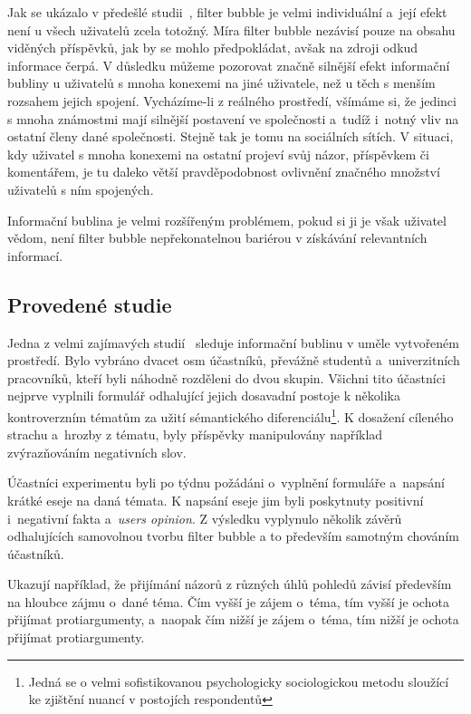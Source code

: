 \documentclass[12pt, a4paper]{article}
\numberwithin{equation}{section} 	%
\begin{document}
Jak se ukázalo v předešlé studii~\cite{TheImpactOfFilterBubble}, filter bubble je velmi individuální a~její efekt není u všech uživatelů zcela totožný. Míra filter bubble nezávisí pouze na obsahu viděných příspěvků, jak by se mohlo předpokládat, avšak na zdroji odkud informace čerpá. V důsledku můžeme pozorovat značně silnější efekt informační bubliny u uživatelů s mnoha konexemi na jiné uživatele, než u těch s menším rozsahem jejich spojení. Vycházíme-li z reálného prostředí, všímáme si, že jedinci s mnoha známostmi mají silnější postavení ve společnosti a~tudíž i~notný vliv na ostatní členy dané společnosti. Stejně tak je tomu na sociálních sítích. V situaci, kdy uživatel s mnoha konexemi na ostatní projeví svůj názor, příspěvkem či komentářem, je tu daleko větší pravděpodobnost ovlivnění značného množství uživatelů s ním spojených.

Informační bublina je velmi rozšířeným problémem, pokud si ji je však uživatel vědom, není filter bubble nepřekonatelnou bariérou v získávání relevantních informací.

\subsection{Provedené studie}
\noindent Jedna z velmi zajímavých studií~\cite{BeyondFilterBubble} sleduje informační bublinu v uměle vytvořeném prostředí. Bylo vybráno dvacet osm účastníků, převážně studentů a~univerzitních pracovníků, kteří byli náhodně rozděleni do dvou skupin. Všichni tito účastníci nejprve vyplnili formulář odhalující jejich dosavadní postoje k několika kontroverzním tématům za užití sémantického diferenciálu\footnote{Jedná se o velmi sofistikovanou psychologicky sociologickou metodu sloužící ke zjištění nuancí v postojích respondentů}. K dosažení cíleného strachu a~hrozby z tématu, byly příspěvky manipulovány například zvýrazňováním negativních slov.

Účastníci experimentu byli po týdnu požádáni o~vyplnění formuláře a~napsání krátké eseje na daná témata. K napsání eseje jim byli poskytnuty positivní i~negativní fakta a~\textit{users opinion}. Z výsledku vyplynulo několik závěrů odhalujících samovolnou tvorbu filter bubble a to především samotným chováním účastníků.

 Ukazují například, že přijímání názorů z různých úhlů pohledů závisí především na hloubce zájmu o~dané téma. Čím vyšší je zájem o~téma, tím vyšší je ochota přijímat protiargumenty, a~naopak čím nižší je zájem o~téma, tím nižší je ochota přijímat protiargumenty.
\end{document}

